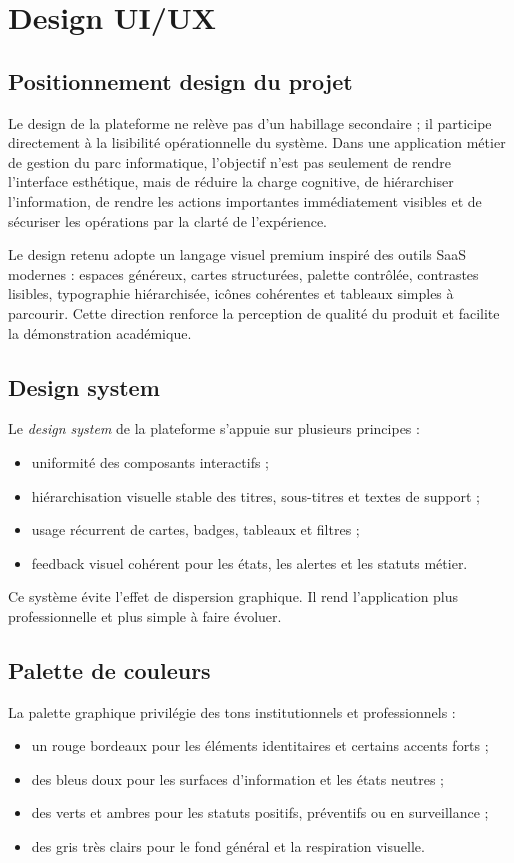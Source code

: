 ﻿\chapter{Design UI/UX}
\label{chap:uiux}

\section{Positionnement design du projet}
Le design de la plateforme ne relève pas d'un habillage secondaire ; il participe directement à la lisibilité opérationnelle du système. Dans une application métier de gestion du parc informatique, l'objectif n'est pas seulement de rendre l'interface esthétique, mais de réduire la charge cognitive, de hiérarchiser l'information, de rendre les actions importantes immédiatement visibles et de sécuriser les opérations par la clarté de l'expérience.

Le design retenu adopte un langage visuel premium inspiré des outils SaaS modernes : espaces généreux, cartes structurées, palette contrôlée, contrastes lisibles, typographie hiérarchisée, icônes cohérentes et tableaux simples à parcourir. Cette direction renforce la perception de qualité du produit et facilite la démonstration académique.

\section{Design system}
Le \textit{design system} de la plateforme s'appuie sur plusieurs principes :
\begin{itemize}
  \item uniformité des composants interactifs ;
  \item hiérarchisation visuelle stable des titres, sous-titres et textes de support ;
  \item usage récurrent de cartes, badges, tableaux et filtres ;
  \item feedback visuel cohérent pour les états, les alertes et les statuts métier.
\end{itemize}

Ce système évite l'effet de dispersion graphique. Il rend l'application plus professionnelle et plus simple à faire évoluer.

\section{Palette de couleurs}
La palette graphique privilégie des tons institutionnels et professionnels :
\begin{itemize}
  \item un rouge bordeaux pour les éléments identitaires et certains accents forts ;
  \item des bleus doux pour les surfaces d'information et les états neutres ;
  \item des verts et ambres pour les statuts positifs, préventifs ou en surveillance ;
  \item des gris très clairs pour le fond général et la respiration visuelle.
\end{itemize}

